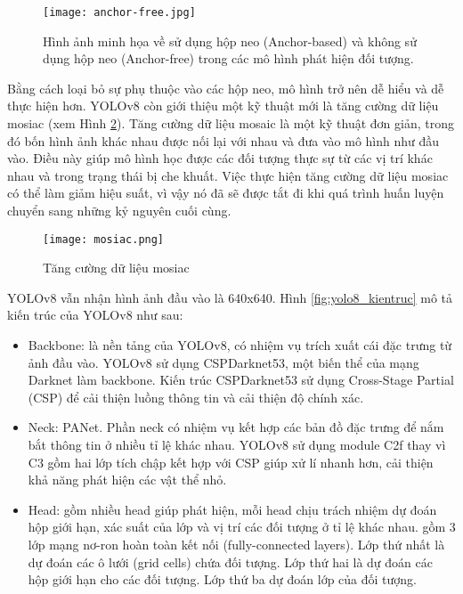 \documentclass[../the.tex]{subfiles}
\begin{document}
\begin{figure}[H]
	\centering
	\texttt{[image: anchor-free.jpg]}
	\caption[]{Hình ảnh minh họa về sử dụng hộp neo (Anchor-based) và không sử dụng hộp neo (Anchor-free) trong các mô hình phát hiện đối tượng. \footnotemark}
	\label{fig:anchorfree}
\end{figure}



{\fontsize{13}{12} \selectfont

	Bằng cách loại bỏ sự phụ thuộc vào các hộp neo, mô hình trở nên dễ hiểu và dễ thực hiện hơn.
	YOLOv8 còn giới thiệu một kỹ thuật mới là tăng cường dữ liệu mosiac (xem Hình \ref{fig:mosaic}). Tăng cường dữ liệu mosaic là một kỹ thuật đơn giản, trong đó bốn hình ảnh khác nhau được nối lại với nhau và đưa vào mô hình như đầu vào. Điều này giúp mô hình học được các đối tượng thực sự từ các vị trí khác nhau và trong trạng thái bị che khuất.
	Việc thực hiện tăng cường dữ liệu mosiac có thể làm giảm hiệu suất, vì vậy nó đã sẽ được tắt đi khi quá trình huấn luyện chuyển sang những kỷ nguyên cuối cùng.

}
\begin{figure}[H]
	\centering
	\texttt{[image: mosiac.png]}
	\caption[]{Tăng cường dữ liệu mosiac\footnotemark}
	\label{fig:mosaic}
\end{figure}


\bigskip

{\fontsize{13}{12} \selectfont
	YOLOv8 vẫn nhận hình ảnh đầu vào là 640x640. Hình \ref{fig:yolo8_kientruc} mô tả kiến trúc của YOLOv8 như sau:
	\begin{itemize}
		\item Backbone: là nền tảng của YOLOv8, có nhiệm vụ trích xuất cái đặc trưng từ ảnh đầu vào. YOLOv8 sử dụng CSPDarknet53, một biến thể của mạng Darknet làm backbone.
		      Kiến trúc CSPDarknet53 sử dụng Cross-Stage Partial (CSP) để cải thiện luồng thông tin và cải thiện độ chính xác.
		\item Neck: PANet. Phần neck có nhiệm vụ kết hợp các bản đồ đặc trưng để nắm bắt thông tin ở nhiều tỉ lệ khác nhau. YOLOv8 sử dụng module C2f thay vì C3 gồm hai lớp tích chập kết hợp với CSP giúp xử lí nhanh hơn, cải thiện khả năng phát hiện các vật thể nhỏ.
		\item Head: gồm nhiều head giúp phát hiện, mỗi head chịu trách nhiệm dự đoán hộp giới hạn, xác suất của lớp và vị trí các đối tượng ở tỉ lệ  khác nhau.
		      gồm 3 lớp mạng nơ-ron hoàn toàn kết nối
		      (fully-connected layers). Lớp thứ nhất
		      là dự đoán các ô lưới (grid cells) chứa đối
		      tượng. Lớp thứ hai là dự đoán các hộp giới hạn cho các đối tượng. Lớp thứ ba dự đoán lớp của đối tượng.
	\end{itemize}

}
\end{document}
